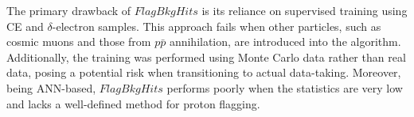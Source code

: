 The primary drawback of $FlagBkgHits$ is its reliance 
on supervised training using CE and $\delta$-electron samples. 
This approach fails when other particles, such as cosmic muons 
and those from $p\bar{p}$ annihilation, are introduced into the algorithm. 
Additionally, the training was performed using Monte Carlo data 
rather than real data, posing a potential risk when transitioning 
to actual data-taking. Moreover, being ANN-based, $FlagBkgHits$ 
performs poorly when the statistics are very low and lacks 
a well-defined method for proton flagging.
